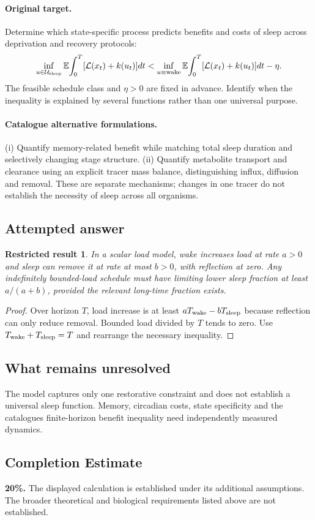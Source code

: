 \documentclass[11pt]{article}
\newcommand{\E}{\mathbb E}
\providecommand{\E}{\mathbb E}
\newtheorem{attemptresult}{Restricted result}[section]
\begin{document}
\paragraph{Original target.}
Determine which state-specific process predicts benefits and costs of sleep across deprivation and recovery protocols:
\[
\inf_{u\in\mathcal U_{\rm sleep}}\E\!\int_0^T[\mathcal L(x_t)+k(u_t)]dt
<\inf_{u\equiv\text{wake}}\E\!\int_0^T[\mathcal L(x_t)+k(u_t)]dt-\eta.
\]
The feasible schedule class and $\eta>0$ are fixed in advance. Identify when the inequality is explained by several functions rather than one universal purpose.
\paragraph{Catalogue alternative formulations.}
(i) Quantify memory-related benefit while matching total sleep duration and selectively changing stage structure. (ii) Quantify metabolite transport and clearance using an explicit tracer mass balance, distinguishing influx, diffusion and removal. These are separate mechanisms; changes in one tracer do not establish the necessity of sleep across all organisms.
\subsection{Attempted answer}
\begin{attemptresult}
In a scalar load model, wake increases load at rate $a>0$ and sleep can remove it at rate at most $b>0$, with reflection at zero. Any indefinitely bounded-load schedule must have limiting lower sleep fraction at least $a/(a+b)$, provided the relevant long-time fraction exists.
\end{attemptresult}
\begin{proof}
Over horizon $T$, load increase is at least $aT_{\rm wake}-bT_{\rm sleep}$ because reflection can only reduce removal. Bounded load divided by $T$ tends to zero. Use $T_{\rm wake}+T_{\rm sleep}=T$ and rearrange the necessary inequality.
\end{proof}
\subsection{What remains unresolved}
The model captures only one restorative constraint and does not establish a universal sleep function. Memory, circadian costs, state specificity and the catalogue\textquotesingle s finite-horizon benefit inequality need independently measured dynamics.
\subsection{Completion Estimate}
\textbf{20\%.} The displayed calculation is established under its additional assumptions. The broader theoretical and biological requirements listed above are not established.
\end{document}
